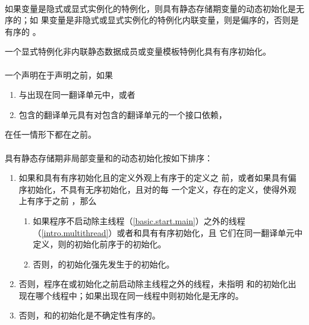\paragraph{} %
如果变量是隐式或显式实例化的特例化，则具有静态存储期变量的动态初始化是无序的；如
果变量是非隐式或显式实例化的特例化内联变量，则是偏序的，否则是有序的 。

\begin{note}
  一个显式特例化非内联静态数据成员或变量模板特例化具有有序初始化。
\end{note}

\paragraph{} %
一个声明在于声明之前，如果
\begin{enumerate}
  \item {}与出现在同一翻译单元中，或者
  \item 包含的翻译单元具有对包含的翻译单元的一个接口依赖，
\end{enumerate}
在任一情形下都在之前。

\paragraph{} %
具有静态存储期非局部变量和的动态初始化按如下排序：
\begin{enumerate}
  \item 如果和具有有序初始化且的定义外观上有序于的定义之
        前，或者如果具有偏序初始化，不具有无序初始化，且对的每
        一个定义，存在的定义，使得外观上有序于之前
        ，那么
        \begin{enumerate}
          \item 如果程序不启动除主线程（\ref{basic.start.main}）之外的线程
                （\ref{intro.multithread}）或者和具有有序初始化，且
                它们在同一翻译单元中定义，则的初始化前序于的初始化。
          \item 否则，的初始化强先发生于的初始化。
        \end{enumerate}
  \item 否则，程序在或初始化之前启动除主线程之外的线程，未指明
        和的初始化出现在哪个线程中；如果出现在同一线程中则初始化是无序的。
  \item 否则，和的初始化是不确定性有序的。
\end{enumerate}

